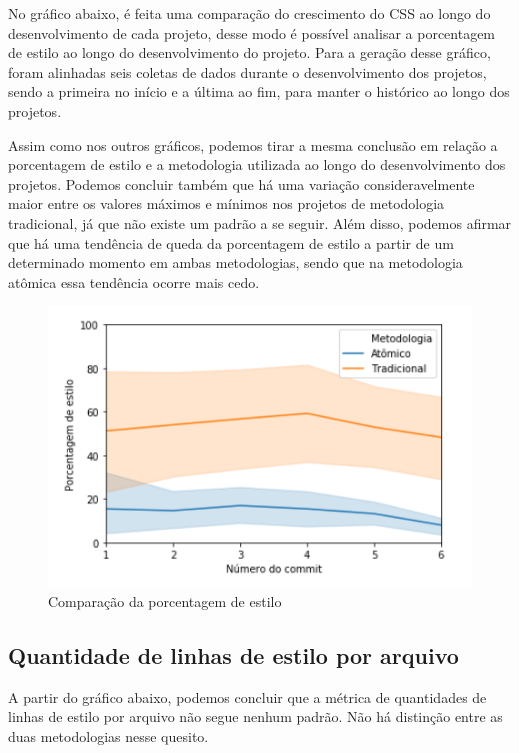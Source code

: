 No gráfico abaixo, é feita uma comparação do crescimento do CSS ao longo do desenvolvimento de cada projeto, desse modo é possível analisar a porcentagem de estilo ao longo do desenvolvimento do projeto. Para a geração desse gráfico, foram alinhadas seis coletas de dados durante o desenvolvimento dos projetos, sendo a primeira no início e a última ao fim, para manter o histórico ao longo dos projetos.

Assim como nos outros gráficos, podemos tirar a mesma conclusão em relação a porcentagem de estilo e a metodologia utilizada ao longo do desenvolvimento dos projetos. Podemos concluir também que há uma variação consideravelmente maior entre os valores máximos e mínimos nos projetos de metodologia tradicional, já que não existe um padrão a se seguir. Além disso, podemos afirmar que há uma tendência de queda da porcentagem de estilo a partir de um determinado momento em ambas metodologias, sendo que na metodologia atômica essa tendência ocorre mais cedo.


\begin{figure}[H]
\centering
\includegraphics{figuras/commit-porcentagem-estilo.png}
\caption{Comparação da porcentagem de estilo}
\end{figure}


\hypertarget{porcentagem de estilo}{%
\subsection{Quantidade de linhas de estilo por arquivo}\label{parcel}}

A partir do gráfico abaixo, podemos concluir que a métrica de quantidades de linhas de estilo por arquivo não segue nenhum padrão. Não há distinção entre as duas metodologias nesse quesito.

